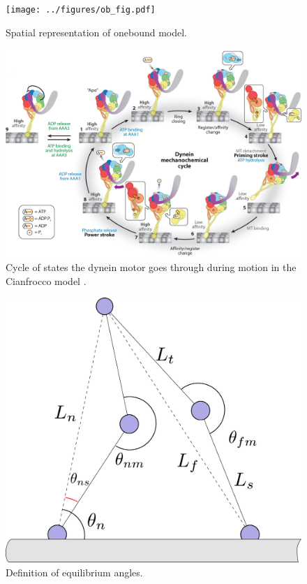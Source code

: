 \documentclass[10pt]{article} %
\begin{document}
\begin{figure}[h!]
  \centering
  \texttt{[image: ../figures/ob\_fig.pdf]}
  \caption{Spatial representation of onebound model.}
  \label{ob_fig}
\end{figure}

\begin{figure}[h!]
  \centering
  \includegraphics[width=.85\textwidth,keepaspectratio]{../figures/mechanochemical-cycle.jpeg}
  \caption{Cycle of states the dynein motor goes through during motion in the Cianfrocco model \cite{cianfroccoreview}.}
  \label{mech-cycle}
\end{figure}

\begin{figure}[h!]
  \centering
  \includegraphics[width=.45\textwidth]{../figures/code-bothbound.pdf}
  \caption{Definition of equilibrium angles.}
  \label{bb_fig}
\end{figure}
\end{document}

